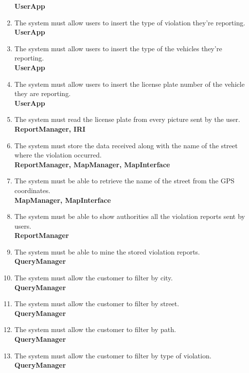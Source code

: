 \begin{enumerate}[label=\textbf{R\arabic*}]
		\textbf{UserApp}
		\item \label{req:violationType} The system must allow users to insert the type of violation they’re reporting.\\
		\textbf{UserApp}
		\item \label{req:vehicleType} The system must allow users to insert the type of the vehicles they’re reporting.\\
		\textbf{UserApp}
		\item \label{req:plateNumber} The system must allow users to insert the license plate number of the vehicle they are reporting.\\
		\textbf{UserApp}
		\item \label{req:readPlate} The system must read the license plate from every picture sent by the user.\\
		\textbf{ReportManager, IRI}
		\item \label{req:storeViolation} The system must store the data received along with the name of the street where the violation occurred.\\
		\textbf{ReportManager, MapManager, MapInterface}
		\item \label{req:streetName} The system must be able to retrieve the name of the street from the GPS coordinates.\\
		\textbf{MapManager, MapInterface}
		\item \label{req:notifyAuthority} The system must be able to show authorities all the violation reports sent by users.\\
		\textbf{ReportManager}
		\item \label{req:mineData} The system must be able to mine the stored violation reports.\\
		\textbf{QueryManager}
		\item \label{req:cityFilter} The system must allow the customer to filter by city.\\
		\textbf{QueryManager}
		\item \label{req:streetFilter} The system must allow the customer to filter by street.\\
		\textbf{QueryManager}
		\item \label{req:pathFilter} The system must allow the customer to filter by path.\\
		\textbf{QueryManager}
		\item \label{req:violationFilter} The system must allow the customer to filter by type of violation.\\
		\textbf{QueryManager}

\end{enumerate}
